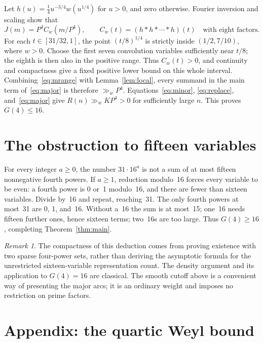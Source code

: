 \documentclass[11pt]{article}
\theoremstyle{remark}\newtheorem*{remark}{Remark}
\begin{document}
Let \(h(u)=\frac14u^{-3/4}w(u^{1/4})\) for \(u>0\), and zero
otherwise. Fourier inversion and scaling show that
\[
 J(m)=P^4 C_w(m/P^4),\qquad C_w(t)=(h*h*\cdots*h)(t)
 \quad\text{with eight factors}.
\]
For each \(t\in[31/32,1]\), the point \((t/8)^{1/4}\) is strictly
inside \((1/2,7/10)\), where \(w>0\). Choose the first seven
convolution variables sufficiently near \(t/8\); the eighth is then
also in the positive range. Thus \(C_w(t)>0\), and continuity and
compactness give a fixed positive lower bound on this whole interval.
Combining~\eqref{eq:mrange} with Lemma~\ref{lem:local}, every summand
in the main term of~\eqref{eq:major} is therefore \(\gg_w P^4\).
Equations~\eqref{eq:minor}, \eqref{eq:replace}, and~\eqref{eq:major}
give \(R(n)\gg_w KP^4>0\) for sufficiently large \(n\).
This proves \(G(4)\le16\).

\section{The obstruction to fifteen variables}

For every integer \(a\ge0\), the number \(31\cdot16^a\) is not a
sum of at most fifteen nonnegative fourth powers. If \(a\ge1\),
reduction modulo~16 forces every variable to be even: a fourth power is
0 or~1 modulo~16, and there are fewer than sixteen variables.
Divide by~16 and repeat, reaching~31. The only fourth powers at most~31
are 0, 1, and~16. Without a~16 the sum is at most~15; one~16 needs fifteen
further ones, hence sixteen terms; two~16s are too large.
Thus \(G(4)\ge16\), completing Theorem~\ref{thm:main}.

\begin{remark}
The compactness of this deduction comes from proving existence with
two sparse four-power sets, rather than deriving the asymptotic formula
for the unrestricted sixteen-variable representation count. The density
argument and its application to \(G(4)=16\) are classical. The smooth
cutoff above is a convenient way of presenting the major arcs; it is
an ordinary weight and imposes no restriction on prime factors.
\end{remark}

\section*{Appendix: the quartic Weyl bound}
\end{document}
